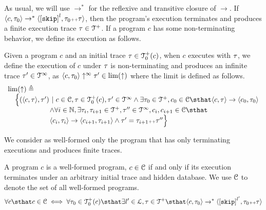  As usual, we will use $\to^*$ for the reflexive and transitive closure of $\to$. 
 If $\config{c, \trace_0} \rightarrow^{*} \config{\clabel{\eskip}^l, \trace_0 \tracecat \trace}$,
 then the program's execution terminates and produces a finite execution trace $\mathtt{\tau} \in \mathcal{T}^{+}$. 
If a program $c$ has some non-terminating behavior, we define its execution as follows.
\\
\begin{defn}
 \label{def:adaptfun-non-terminating}
 Given a program $c$ and an initial trace $\mathtt{\tau} \in \mathcal{T}^{+}_0(c)$,
 when $c$ executes with $\mathtt{\tau}$, we define the execution of $c$ under $\mathtt{\tau}$ is non-terminating and produces an infinite trace $\mathtt{\tau}' \in \mathcal{T}^{\infty}$, as 
 $\langle c, \mathtt{\tau}_0 \rangle \uparrow^{\infty} \mathtt{\tau}' \in \lim(\uparrow)$
 where the limit is defined as follows.
 \[
 \begin{array}{l}
 \lim(\uparrow) 
 \triangleq 
 \\ \quad
 \Big\{
 (\config{c, \trace}, \trace') ~\vert~ 
 c\in \cdom, \trace \in \ftdom_0(c),
 \trace' \in \inftdom
 \land \exists \trace_0 \in \ftdom, c_0 \in \cdom \sthat 
 \config{c, \trace} \to \config{c_0, \trace_0}
 \\ \qquad \qquad \qquad 
 \land \forall i \in \mathbb{N}, \exists \trace_i, \trace_{i + 1} \in \ftdom, \trace'' \in \inftdom, c_i, c_{i + 1} \in \cdom \sthat 
 \\ \qquad \qquad \qquad 
 \config{c_i, \trace_i} \to \config{c_{i + 1}, \trace_{i + 1}} 
 \land \trace' = \trace_{i + 1} \tracecat \trace''
 \Big\}
 \end{array}
 \]
\end{defn}
We consider as well-formed only the program that has only terminating executions and produces finite traces. 
\begin{defn}
 \label{def:adaptfun-wfprog} 
 A program $c$ is a well-formed program, $c \in \mathcal{C}$ if and only if
 its execution terminates
 under an arbitrary initial trace and hidden database. We use $\mathcal{C}$ to denote the set of all well-formed programs.
 \[
 \forall c \sthat c \in \cdom \iff 
 \forall \trace_0 \in \ftdom_0(c) \sthat \exists l' \in \ldom, \trace \in \ftdom
 \sthat \config{c, \trace_0} \xrightarrow{}^* \config{\clabel{\eskip}^{l'}, \trace_0 \tracecat \trace}
 \]
\end{defn}
